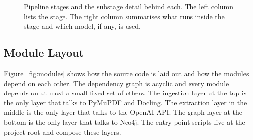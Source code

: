 \documentclass{article}
\begin{document}
\begin{figure}[H]
\caption{Pipeline stages and the substage detail behind each. The
left column lists the stage. The right column summarises what runs
inside the stage and which model, if any, is used.}
\label{fig:pipeline}
\end{figure}

\subsection{Module Layout}

Figure~\ref{fig:modules} shows how the source code is laid out and how
the modules depend on each other. The dependency graph is acyclic and
every module depends on at most a small fixed set of others. The
ingestion layer at the top is the only layer that talks to PyMuPDF and
Docling. The extraction layer in the middle is the only layer that
talks to the OpenAI API. The graph layer at the bottom is the only
layer that talks to Neo4j. The entry point scripts live at the project
root and compose these layers.
\end{document}
